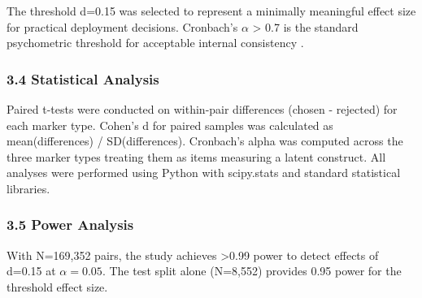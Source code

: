 The threshold d=0.15 was selected to represent a minimally meaningful effect size for practical deployment decisions. Cronbach's $\alpha$ > 0.7 is the standard psychometric threshold for acceptable internal consistency \citep{nunnally1978psychometric}.

\subsubsection{3.4 Statistical Analysis}

Paired t-tests were conducted on within-pair differences (chosen - rejected) for each marker type. Cohen's d for paired samples was calculated as mean(differences) / SD(differences). Cronbach's alpha was computed across the three marker types treating them as items measuring a latent construct. All analyses were performed using Python with scipy.stats and standard statistical libraries.

\subsubsection{3.5 Power Analysis}

With N=169,352 pairs, the study achieves >0.99 power to detect effects of d=0.15 at $\alpha =0.05$. The test split alone (N=8,552) provides 0.95 power for the threshold effect size.
